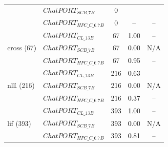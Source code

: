 \begin{table}[t]
\begin{tabular}{llccc}
&  $ChatPORT_{SCB\_7B}$ & 0 & -- & -- \\
&  $ChatPORT_{HPC\_C\_6.7B}$ & 0 & -- & -- \\
\hline 
\multirow{3}{*}{cross (67)} &  $ChatPORT_{CL\_13B}$ & 67 & 1.00 & --  \\
&  $ChatPORT_{SCB\_7B}$ & 67 & 0.00 & N/A \\
&  $ChatPORT_{HPC\_C\_6.7B}$ & 67 & 0.95 & -- \\
\hline 
\multirow{3}{*}{nlll (216)} &  $ChatPORT_{CL\_13B}$ & 216 & 0.63 & --  \\
&  $ChatPORT_{SCB\_7B}$ & 216 & 0.00 & N/A \\
&  $ChatPORT_{HPC\_C\_6.7B}$ & 216 & 0.37 & -- \\
\hline 
\multirow{3}{*}{lif (393)} &  $ChatPORT_{CL\_13B}$ & 393 & 1.00 & --  \\
&  $ChatPORT_{SCB\_7B}$ & 393 & 0.00 & N/A \\
&  $ChatPORT_{HPC\_C\_6.7B}$ & 393 & 0.81 & -- \\
\hline
\end{tabular}
\end{table}
